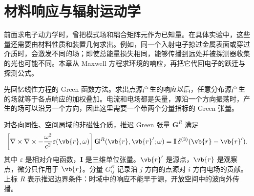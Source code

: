 \chapter{材料响应与辐射运动学}\label{chap:media-radiation}

前面求电子动力学时，曾把模式场和耦合矩阵元作为已知量。在具体实验中，这些量还需要由材料性质和装置几何求出。例如，同一个入射电子掠过金属表面或穿过介质时，会激发不同的场；即使总能量损失相同，能够传播到远处并被探测器收集的光也可能不同。本章从 Maxwell 方程求环境的响应，再把它代回电子的跃迁与探测公式。

先回忆线性方程的 Green 函数方法。求出点源产生的响应以后，任意分布源产生的场就等于各点响应的加权叠加。电流和电场都是矢量，源沿一个方向振荡时，产生的场可以沿另一个方向，因此这里需要一个带两个分量指标的 Green 张量。\begin{definition}
对各向同性、空间局域的非磁性介质，推迟 Green 张量 $\mathbf G^R$ 满足
\begin{equation}
{
\left[\nabla\times\nabla\times
-\frac{\omega^2}{c^2}\varepsilon(\vb{r},\omega)\right]
\mathbf G^R(\vb{r},\vb{r}';\omega)
=\mathbf I\,\delta^{(3)}(\vb{r}-\vb{r}').}
\label{eq:retarded_green_tensor_beginner_definition_dp123}
\end{equation}
其中 $\varepsilon$ 是相对介电函数，$\mathbf I$ 是三维单位张量。$\vb{r}'$ 是源点，$\vb{r}$ 是观察点，微分只作用于 $\vb{r}$。分量 $G^R_{ij}$ 记录沿 $j$ 方向的点源对 $i$ 方向电场的贡献。上标 $R$ 表示推迟边界条件：时域中的响应不能早于源，开放空间中的波向外传播。
\end{definition}

